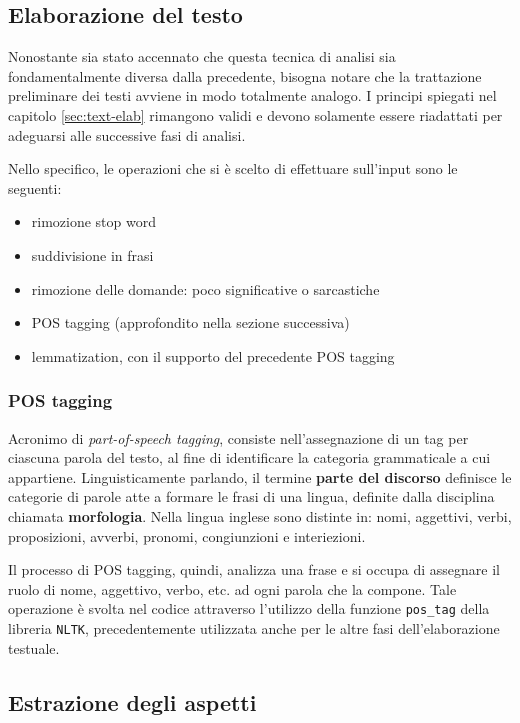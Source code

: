 \documentclass[hidelinks, 12pt]{article}
\begin{document}
\subsection{Elaborazione del testo}

Nonostante sia stato accennato che questa tecnica di analisi sia fondamentalmente diversa dalla precedente, bisogna notare che la trattazione preliminare dei testi avviene in modo totalmente analogo. I principi spiegati nel capitolo \ref{sec:text-elab} rimangono validi e devono solamente essere riadattati per adeguarsi alle successive fasi di analisi.

Nello specifico, le operazioni che si è scelto di effettuare sull'input sono le seguenti:

\begin{itemize}
	\item rimozione stop word
	\item suddivisione in frasi
	\item rimozione delle domande: poco significative o sarcastiche
	\item POS tagging (approfondito nella sezione successiva)
	\item lemmatization, con il supporto del precedente POS tagging
\end{itemize}


\subsubsection{POS tagging}

Acronimo di \textit{part-of-speech tagging}, consiste nell'assegnazione di un tag per ciascuna parola del testo, al fine di identificare la categoria grammaticale a cui appartiene. Linguisticamente parlando, il termine \textbf{parte del discorso} definisce le categorie di parole atte a formare le frasi di una lingua, definite dalla disciplina chiamata \textbf{morfologia}. Nella lingua inglese sono distinte in: nomi, aggettivi, verbi, proposizioni, avverbi, pronomi, congiunzioni e interiezioni.

Il processo di POS tagging, quindi, analizza una frase e si occupa di assegnare il ruolo di nome, aggettivo, verbo, etc. ad ogni parola che la compone. Tale operazione è svolta nel codice attraverso l'utilizzo della funzione \texttt{pos\_tag} della libreria \texttt{NLTK}, precedentemente utilizzata anche per le altre fasi dell'elaborazione testuale.



\subsection{Estrazione degli aspetti}
\end{document}
